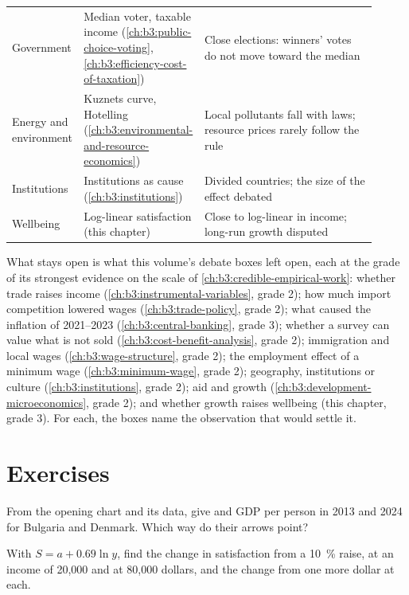 \begin{center}
\begin{tabular}{p{0.17\linewidth}p{0.27\linewidth}p{0.47\linewidth}}
  Government & Median voter, taxable income (\ref{ch:b3:public-choice-voting}, \ref{ch:b3:efficiency-cost-of-taxation}) & Close elections: winners' votes do not move toward the median \\
  Energy and environment & Kuznets curve, Hotelling (\ref{ch:b3:environmental-and-resource-economics}) & Local pollutants fall with laws; resource prices rarely follow the rule \\
  Institutions & Institutions as cause (\ref{ch:b3:institutions}) & Divided countries; the size of the effect debated \\
  Wellbeing & Log-linear satisfaction (this chapter) & Close to log-linear in income; long-run growth disputed \\ \hline
\end{tabular}
\end{center}

What stays open is what this volume's debate boxes left open, each at the grade of its
strongest evidence on the scale of \cref{ch:b3:credible-empirical-work}: whether trade raises income
(\cref{ch:b3:instrumental-variables}, grade 2); how much import competition lowered wages
(\cref{ch:b3:trade-policy}, grade 2); what caused the inflation of 2021--2023 (\cref{ch:b3:central-banking},
grade 3); whether a survey can value what is not sold (\cref{ch:b3:cost-benefit-analysis}, grade 2);
immigration and local wages (\cref{ch:b3:wage-structure}, grade 2); the employment effect of a
minimum wage (\cref{ch:b3:minimum-wage}, grade 2); geography, institutions or culture
(\cref{ch:b3:institutions}, grade 2); aid and growth (\cref{ch:b3:development-microeconomics}, grade 2); and
whether growth raises wellbeing (this chapter, grade 3). For each, the boxes name the
observation that would settle it.

\section{Exercises}\label{sec:b3:income-and-wellbeing-evidence:exercises}

\begin{exercise}[$\star$]\label{exo:b3:income-and-wellbeing-evidence:1}
From the opening chart and its data, give  and GDP per person in 2013 and
2024 for Bulgaria and Denmark. Which way do their arrows point?
\end{exercise}

\begin{exercise}[$\star$]\label{exo:b3:income-and-wellbeing-evidence:2}
With $S = a + 0.69\ln y$, find the change in satisfaction from a 10~\% raise, at an income of 20{,}000 and at 80{,}000 dollars, and
the change from one more dollar at each.
\end{exercise}

